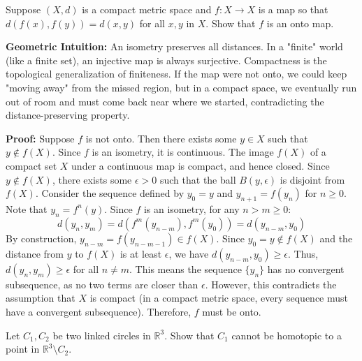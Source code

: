 \begin{exercise}
\label{geometry:2011:2}
Suppose $(X, d)$ is a compact metric space and $f : X \to X$ is a map so that $d(f(x), f(y)) = d(x, y)$ for all $x, y$ in $X$. Show that $f$ is an onto map.
\end{exercise}

\begin{solution}
\textbf{Geometric Intuition:} An isometry preserves all distances. In a "finite" world (like a finite set), an injective map is always surjective. Compactness is the topological generalization of finiteness. If the map were not onto, we could keep "moving away" from the missed region, but in a compact space, we eventually run out of room and must come back near where we started, contradicting the distance-preserving property.

\textbf{Proof:} Suppose $f$ is not onto. Then there exists some $y \in X$ such that $y \notin f(X)$. Since $f$ is an isometry, it is continuous. The image $f(X)$ of a compact set $X$ under a continuous map is compact, and hence closed. Since $y \notin f(X)$, there exists some $\epsilon > 0$ such that the ball $B(y, \epsilon)$ is disjoint from $f(X)$.
Consider the sequence defined by $y_0 = y$ and $y_{n+1} = f(y_n)$ for $n \geq 0$. Note that $y_n = f^n(y)$. Since $f$ is an isometry, for any $n > m \geq 0$:
\[ d(y_n, y_m) = d(f^m(y_{n-m}), f^m(y_0)) = d(y_{n-m}, y_0) \]
By construction, $y_{n-m} = f(y_{n-m-1}) \in f(X)$. Since $y_0 = y \notin f(X)$ and the distance from $y$ to $f(X)$ is at least $\epsilon$, we have $d(y_{n-m}, y_0) \geq \epsilon$.
Thus, $d(y_n, y_m) \geq \epsilon$ for all $n \neq m$. This means the sequence $\{y_n\}$ has no convergent subsequence, as no two terms are closer than $\epsilon$. However, this contradicts the assumption that $X$ is compact (in a compact metric space, every sequence must have a convergent subsequence). Therefore, $f$ must be onto.
\end{solution}

\begin{exercise}
\label{geometry:2011:3}
Let $C_{1}, C_{2}$ be two linked circles in $\mathbb{R}^{3}$. Show that $C_{1}$ cannot be homotopic to a point in $\mathbb{R}^{3} \setminus C_{2}$.
\end{exercise}



